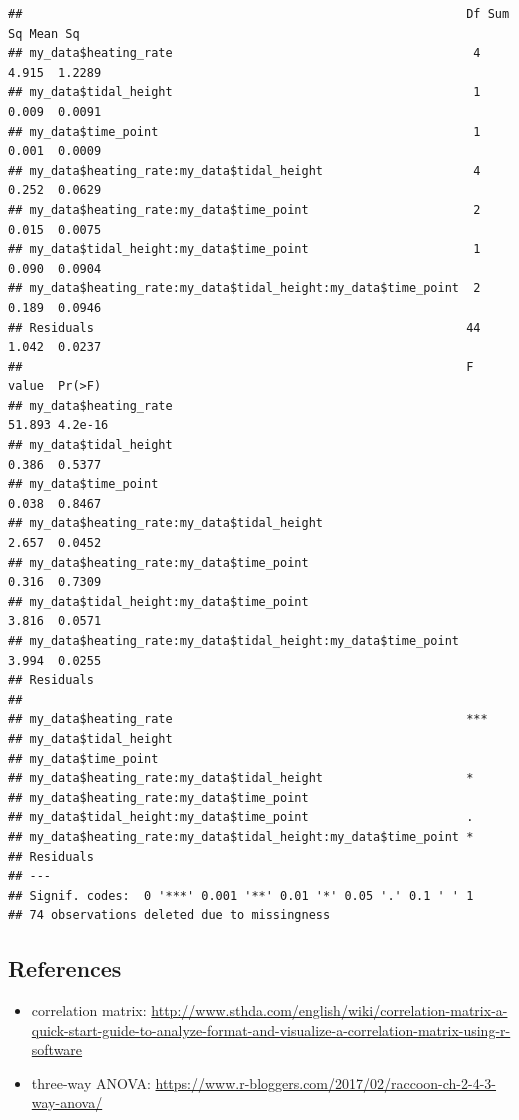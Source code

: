 \documentclass[
]{article}
\providecommand{\tightlist}{%
  \setlength{\itemsep}{0pt}\setlength{\parskip}{0pt}}
\begin{document}
\begin{verbatim}
##                                                              Df Sum Sq Mean Sq
## my_data$heating_rate                                          4  4.915  1.2289
## my_data$tidal_height                                          1  0.009  0.0091
## my_data$time_point                                            1  0.001  0.0009
## my_data$heating_rate:my_data$tidal_height                     4  0.252  0.0629
## my_data$heating_rate:my_data$time_point                       2  0.015  0.0075
## my_data$tidal_height:my_data$time_point                       1  0.090  0.0904
## my_data$heating_rate:my_data$tidal_height:my_data$time_point  2  0.189  0.0946
## Residuals                                                    44  1.042  0.0237
##                                                              F value  Pr(>F)
## my_data$heating_rate                                          51.893 4.2e-16
## my_data$tidal_height                                           0.386  0.5377
## my_data$time_point                                             0.038  0.8467
## my_data$heating_rate:my_data$tidal_height                      2.657  0.0452
## my_data$heating_rate:my_data$time_point                        0.316  0.7309
## my_data$tidal_height:my_data$time_point                        3.816  0.0571
## my_data$heating_rate:my_data$tidal_height:my_data$time_point   3.994  0.0255
## Residuals                                                                   
##                                                                 
## my_data$heating_rate                                         ***
## my_data$tidal_height                                            
## my_data$time_point                                              
## my_data$heating_rate:my_data$tidal_height                    *  
## my_data$heating_rate:my_data$time_point                         
## my_data$tidal_height:my_data$time_point                      .  
## my_data$heating_rate:my_data$tidal_height:my_data$time_point *  
## Residuals                                                       
## ---
## Signif. codes:  0 '***' 0.001 '**' 0.01 '*' 0.05 '.' 0.1 ' ' 1
## 74 observations deleted due to missingness
\end{verbatim}

\hypertarget{references}{%
\subsection{References}\label{references}}

\begin{itemize}
\tightlist
\item
  correlation matrix:
  \url{http://www.sthda.com/english/wiki/correlation-matrix-a-quick-start-guide-to-analyze-format-and-visualize-a-correlation-matrix-using-r-software}
\item
  three-way ANOVA:
  \url{https://www.r-bloggers.com/2017/02/raccoon-ch-2-4-3-way-anova/}
\end{itemize}
\end{document}
